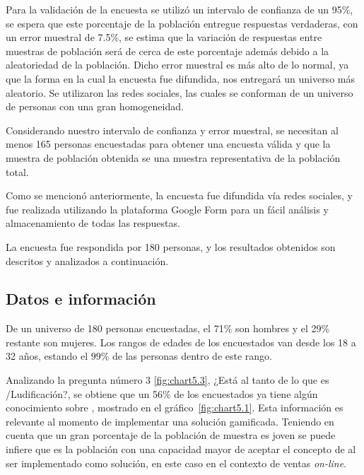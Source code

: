 Para la validación de la encuesta se utilizó un intervalo de confianza de un 95\%,
se espera que este porcentaje de la población entregue respuestas verdaderas,
con un error muestral de 7.5\%, se estima que la variación de respuestas entre
muestras de población será de cerca de este porcentaje además debido a la
aleatoriedad de la población.
Dicho error muestral es más alto de lo normal, ya que la forma en la cual la
encuesta fue difundida, nos entregará un universo más aleatorio.
Se utilizaron las redes sociales, las cuales se conforman de un universo de personas
con una gran homogeneidad.

Considerando nuestro intervalo de confianza y error muestral,
se necesitan al menos 165 personas encuestadas para obtener una encuesta válida
y que la muestra de población obtenida se una muestra representativa de la
población total.

Como se mencionó anteriormente, la encuesta fue difundida vía redes sociales,
y fue realizada utilizando la plataforma Google Form para un fácil análisis y
almacenamiento de todas las respuestas.

La encuesta fue respondida por 180 personas, y los resultados obtenidos son
descritos y analizados a continuación.

\subsection{Datos e información}

De un universo de 180 personas encuestadas, el 71\% son hombres y el 29\%
restante son mujeres.
Los rangos de edades de los encuestados van desde los 18 a 32 años,
estando el $99\%$ de las personas dentro de este rango.

Analizando la pregunta número $3$ \ref{fig:chart5.3},
¿Está al tanto de lo que es {\GAM}/Ludificación?, se obtiene que  un 56\% de los
encuestados ya tiene algún conocimiento sobre {\GAM}, mostrado en el
gráfico~\ref{fig:chart5.1}.
Esta información es relevante al momento de implementar una solución gamificada.
Teniendo en cuenta que un gran porcentaje de la población de muestra es joven
se puede infiere que es la población con una capacidad mayor de aceptar el
concepto de {\GAM} al ser implementado como solución, en este caso en el
contexto de ventas \emph{on-line}.

